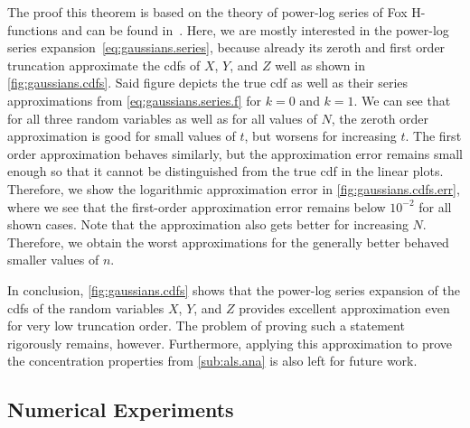 The proof this theorem is based on the theory of power-log series of Fox H-functions and can be found in~\cite{Stojanac}.
Here, we are mostly interested in the power-log series expansion~\eqref{eq:gaussians.series}, because already its zeroth and first order truncation approximate the cdfs of $X$, $Y$, and $Z$ well as shown in \cref{fig:gaussians.cdfs}.
Said figure depicts the true cdf as well as their series approximations from \cref{eq:gaussians.series.f} for $k=0$ and $k=1$.
We can see that for all three random variables as well as for all values of $N$, the zeroth order approximation is good for small values of $t$, but worsens for increasing $t$.
The first order approximation behaves similarly, but the approximation error remains small enough so that it cannot be distinguished from the true cdf in the linear plots.
Therefore, we show the logarithmic approximation error in \cref{fig:gaussians.cdfs.err}, where we see that the first-order approximation error remains below $10^{-2}$ for all shown cases.
Note that the approximation also gets better for increasing $N$.
Therefore, we obtain the worst approximations for the generally better behaved smaller values of $n$.

In conclusion, \cref{fig:gaussians.cdfs} shows that the power-log series expansion of the cdfs of the random variables $X$, $Y$, and $Z$ provides excellent approximation even for very low truncation order.
The problem of proving such a statement rigorously remains, however.
Furthermore, applying this approximation to prove the concentration properties from \cref{sub:als.ana} is also left for future work.



\subsection{Numerical Experiments}%
\label{sub:als.numerics}

